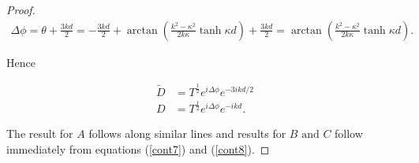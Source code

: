 \documentclass{article}
\begin{document}
\begin{proof}
\begin{subequations}
\begin{align}
\Delta\phi = \theta + \frac{3kd}{2} = -\frac{3kd}{2}+\arctan\left(\frac{k^2-\kappa^2}{2k\kappa}\tanh{\kappa d}\right)+\frac{3kd}{2} = \arctan\left(\frac{k^2-\kappa^2}{2k\kappa}\tanh{\kappa d}\right). \label{phasechange}
\end{align}
\end{subequations}

\noindent Hence

\begin{subequations}
\begin{align}
\tilde{D} &= T^{\frac{1}{2}}e^{i\Delta\phi}e^{-3ikd/2}\\
	D&=T^{\frac{1}{2}}e^{i\Delta\phi}e^{-ikd}.
\end{align}
\end{subequations}

\noindent The result for $A$ follows along similar lines and results for $B \text{ and } C$ follow immediately from equations (\ref{cont7}) and (\ref{cont8}).
\end{proof}
\end{document}
